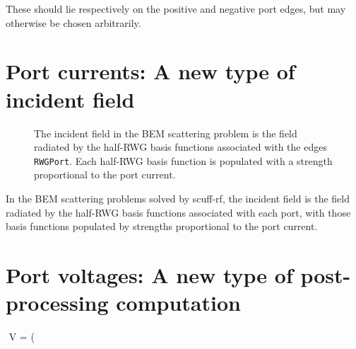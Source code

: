 \documentclass[letterpaper]{article}
\begin{document}
These should lie respectively on the positive and 
negative port edges, but may otherwise be chosen
arbitrarily.

\newpage

\section{Port currents: A new type of incident field}
\label{PortCurrentSection}

\begin{figure}
\begin{center}
\caption{The incident field in the BEM scattering problem
         is the field radiated by the half-RWG basis functions
         associated with the edges \texttt{RWGPort}.
         Each half-RWG basis function is populated with
         a strength proportional to the port current.
        }
\label{RWGPortFigure}
\end{center}
\end{figure}

In the BEM scattering problems solved by {\sc scuff-rf}, the incident
field is the field radiated by the half-RWG basis functions associated 
with each port, with those basis functions populated by strengths
proportional to the port current.

\newpage
\section{Port voltages: A new type of post-processing computation}
\label{PortVoltageSection}

$$ V = \Phi(\vb 
\end{document}
